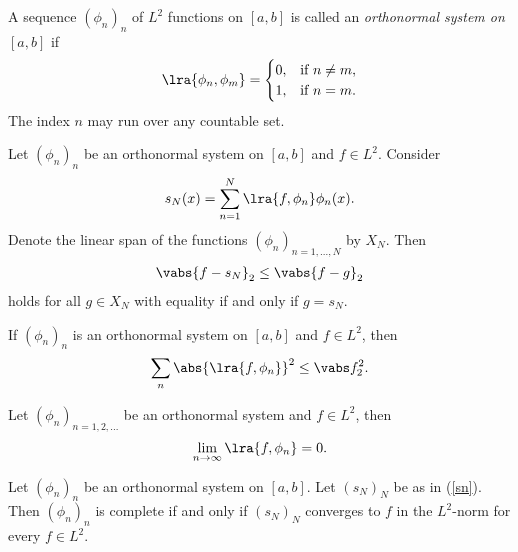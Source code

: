 \documentclass{article}
\begin{document}
\begin{definition}[Notes 5.4]
	A sequence $(\phi_n)_n$ of $L^2$ functions on $[a,b]$ is called an \emph{orthonormal system on $[a,b]$}
	if
	\begin{align*}
		\lra{\phi_n, \phi_m} = \begin{cases}
			                       0, & \text{if }n\not=m, \\
			                       1, & \text{if }n=m.
		                       \end{cases}
	\end{align*}
	The index $n$ may run over any countable set.
\end{definition}

\begin{theorem}[Notes 5.2]
	Let $(\phi_n)_n$ be an orthonormal system on $[a,b]$ and $f\in L^2$. Consider
	\begin{align}
		\label{sn}
		s_N(x) = \sum_{n=1}^N \lra{f,\phi_n}\phi_n(x).
	\end{align}
	Denote the linear span of the functions $(\phi_n)_{n=1,...,N}$ by $X_N$. Then
	\begin{align*}
		\vabs{f-s_N}_2 \leq \vabs{f-g}_2
	\end{align*}
	holds for all $g\in X_N$ with equality if and only if $g=s_N$.
\end{theorem}

\begin{theorem}
	If $(\phi_n)_n$ is an orthonormal system on $[a,b]$ and $f\in L^2$, then
	\begin{align*}
		\sum_n \abs{\lra{f,\phi_n}}^2 \leq \vabs f_2^2.
	\end{align*}
\end{theorem}

\begin{corollary}
	Let $(\phi_n)_{n=1,2,...}$ be an orthonormal system and $f\in L^2$, then
	\begin{align*}
		\lim_{n\to\infty} \lra{f,\phi_n}=0.
	\end{align*}
\end{corollary}

\begin{theorem}[Notes 5.4]
	Let $(\phi_n)_n$ be an orthonormal system on $[a,b]$. Let $(s_N)_N$ be as in (\ref{sn}).
	Then $(\phi_n)_n$ is complete if and only if $(s_N)_N$ converges to $f$ in the $L^2$-norm
	for every $f\in L^2$.
\end{theorem}
\end{document}
